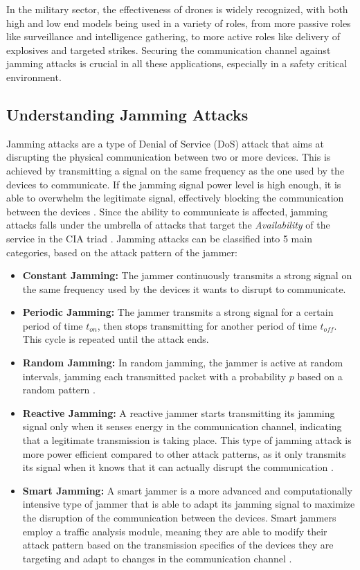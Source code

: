 \documentclass[futureinternet,article,submit,pdftex,moreauthors]{Definitions/mdpi}
\begin{document}
In the military sector, the effectiveness of drones is widely recognized, with both high and low end models being used in a variety of roles, from more passive roles like surveillance and intelligence gathering, to more active roles like
delivery of explosives and targeted strikes. Securing the communication channel against jamming attacks is crucial in all these applications, especially in a safety critical environment. 

\subsection{Understanding Jamming Attacks}

Jamming attacks are a type of Denial of Service (DoS) attack that aims at disrupting the physical communication between two or more devices. 
This is achieved by transmitting a signal on the same frequency as the one used by the devices to communicate. If the jamming signal power level is high enough, 
it is able to overwhelm the legitimate signal, effectively blocking the communication between the devices \cite{DroneCommHassija}. 
Since the ability to communicate is affected, jamming attacks falls under the umbrella of attacks that target the \textit{Availability} of the service in the CIA triad \cite{DataIntegrityCawthra}. 
Jamming attacks can be classified into 5 main categories, based on the attack pattern of the jammer: 

\begin{itemize}
    \item \textbf{Constant Jamming:} The jammer continuously transmits a strong signal on the same frequency used by the devices it wants to disrupt to communicate. 
    \item \textbf{Periodic Jamming:} The jammer transmits a strong signal for a certain period of time \(t_{on}\), then stops transmitting for another period of time \(t_{off}\). This cycle is repeated until the attack ends.
    \item \textbf{Random Jamming:} In random jamming, the jammer is active at random intervals, jamming each transmitted packet with a probability 
    \(p\) based on a random pattern \cite{VANETsAI-Lyamin}. 
    \item \textbf{Reactive Jamming:} A reactive jammer starts transmitting its jamming signal only when it senses energy in the communication channel, 
    indicating that a legitimate transmission is taking place. This type of jamming attack is more power efficient compared to other 
    attack patterns, as it only transmits its signal when it knows that it can actually disrupt the communication \cite{MLMisbehavior5GBoualouache}.
    \item \textbf{Smart Jamming:} A smart jammer is a more advanced and computationally intensive type of jammer that is able to adapt its jamming signal to 
    maximize the disruption of the communication between the devices. Smart jammers employ a traffic analysis module, meaning they are able to modify their attack pattern based on the 
    transmission specifics of the devices they are targeting and adapt to changes in the communication channel \cite{AntiJammingV2V-Feng}. 
\end{itemize}
\end{document}
